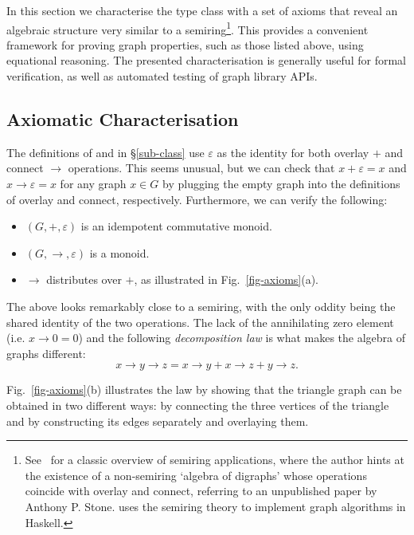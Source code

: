 In this section we characterise the  type class with a set of
axioms that reveal an algebraic structure very similar to a semiring\footnote{
See~\citet{1999_semirings_golan} for a classic overview of semiring
applications, where the author hints at the existence of a non-semiring `algebra of
digraphs' whose operations coincide with overlay and connect, referring to an unpublished
paper by Anthony P. Stone. \citet{2013_semirings_dolan} uses the semiring theory to
implement graph algorithms in Haskell.}.
This provides a convenient framework for proving graph properties, such as
those listed above, using equational reasoning. The presented characterisation is
generally useful for formal verification, as well as automated testing of graph library
APIs.

\subsection{Axiomatic Characterisation}\label{sub-laws}

The definitions of  and  in \S\ref{sub-class}
use $\varepsilon$ as the identity for both overlay $+$ and connect $\rightarrow$
operations. This seems unusual, but we can check that
$x + \varepsilon = x$ and $x \rightarrow \varepsilon = x$ for any graph $x \in G$
by plugging the empty graph into the definitions of overlay and connect,
respectively. Furthermore, we can verify the following:
\begin{itemize}
    \item $(G,+,\varepsilon)$ is an idempotent commutative monoid.
    \item $(G,\rightarrow,\varepsilon)$ is a monoid.
    \item $\rightarrow$ distributes over $+$, as illustrated
    in Fig.~\ref{fig-axioms}(a).
\end{itemize}

\noindent
The above looks remarkably close to a semiring, with the only oddity being the shared
identity of the two operations. The lack of the annihilating zero element (i.e.
$x \rightarrow 0 = 0$) and the following \emph{decomposition law} is what makes the algebra
of graphs different:
\[
x \rightarrow y \rightarrow z = x \rightarrow y + x \rightarrow z + y \rightarrow z.
\]

\noindent
Fig.~\ref{fig-axioms}(b) illustrates the law by showing that the triangle
graph can be obtained in two different ways: by connecting the three vertices
of the triangle and by constructing its edges separately and overlaying them.

